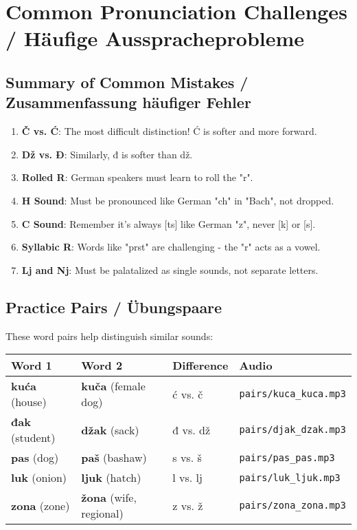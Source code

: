 \section{Common Pronunciation Challenges / Häufige Ausspracheprobleme}

\subsection{Summary of Common Mistakes / Zusammenfassung häufiger Fehler}

\begin{enumerate}
    \item \textbf{Č vs. Ć}: The most difficult distinction! Ć is softer and more forward.
    \item \textbf{Dž vs. Đ}: Similarly, đ is softer than dž.
    \item \textbf{Rolled R}: German speakers must learn to roll the "r".
    \item \textbf{H Sound}: Must be pronounced like German "ch" in "Bach", not dropped.
    \item \textbf{C Sound}: Remember it's always [ts] like German "z", never [k] or [s].
    \item \textbf{Syllabic R}: Words like "prst" are challenging - the "r" acts as a vowel.
    \item \textbf{Lj and Nj}: Must be palatalized as single sounds, not separate letters.
\end{enumerate}

\subsection{Practice Pairs / Übungspaare}

These word pairs help distinguish similar sounds:

\begin{center}
\begin{tabular}{llll}
\toprule
\textbf{Word 1} & \textbf{Word 2} & \textbf{Difference} & \textbf{Audio} \\
\midrule
\textbf{kuća} (house) & \textbf{kuča} (female dog) & ć vs. č & \texttt{pairs/kuca\_kuca.mp3} \\
\textbf{đak} (student) & \textbf{džak} (sack) & đ vs. dž & \texttt{pairs/djak\_dzak.mp3} \\
\textbf{pas} (dog) & \textbf{paš} (bashaw) & s vs. š & \texttt{pairs/pas\_pas.mp3} \\
\textbf{luk} (onion) & \textbf{ljuk} (hatch) & l vs. lj & \texttt{pairs/luk\_ljuk.mp3} \\
\textbf{zona} (zone) & \textbf{žona} (wife, regional) & z vs. ž & \texttt{pairs/zona\_zona.mp3} \\
\bottomrule
\end{tabular}
\end{center}

